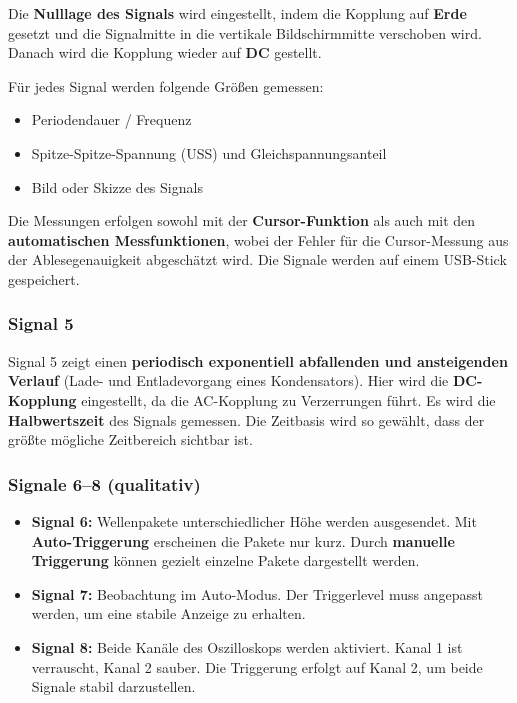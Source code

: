 Die \textbf{Nulllage des Signals} wird eingestellt, indem die Kopplung auf \textbf{Erde} gesetzt und die Signalmitte in die vertikale Bildschirmmitte verschoben wird. Danach wird die Kopplung wieder auf \textbf{DC} gestellt.

Für jedes Signal werden folgende Größen gemessen:
\begin{itemize}
    \item Periodendauer / Frequenz
    \item Spitze-Spitze-Spannung (USS) und Gleichspannungsanteil
    \item Bild oder Skizze des Signals
\end{itemize}
Die Messungen erfolgen sowohl mit der \textbf{Cursor-Funktion} als auch mit den \textbf{automatischen Messfunktionen}, wobei der Fehler für die Cursor-Messung aus der Ablesegenauigkeit abgeschätzt wird. Die Signale werden auf einem USB-Stick gespeichert.

\subsubsection{Signal 5}
Signal 5 zeigt einen \textbf{periodisch exponentiell abfallenden und ansteigenden Verlauf} (Lade- und Entladevorgang eines Kondensators). Hier wird die \textbf{DC-Kopplung} eingestellt, da die AC-Kopplung zu Verzerrungen führt. Es wird die \textbf{Halbwertszeit} des Signals gemessen. Die Zeitbasis wird so gewählt, dass der größte mögliche Zeitbereich sichtbar ist.

\subsubsection{Signale 6–8 (qualitativ)}
\begin{itemize}
    \item \textbf{Signal 6:} Wellenpakete unterschiedlicher Höhe werden ausgesendet. Mit \textbf{Auto-Triggerung} erscheinen die Pakete nur kurz. Durch \textbf{manuelle Triggerung} können gezielt einzelne Pakete dargestellt werden.
    \item \textbf{Signal 7:} Beobachtung im Auto-Modus. Der Triggerlevel muss angepasst werden, um eine stabile Anzeige zu erhalten.
    \item \textbf{Signal 8:} Beide Kanäle des Oszilloskops werden aktiviert. Kanal 1 ist verrauscht, Kanal 2 sauber. Die Triggerung erfolgt auf Kanal 2, um beide Signale stabil darzustellen.
\end{itemize}

